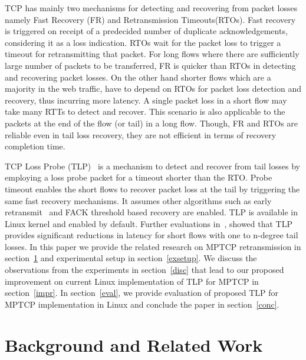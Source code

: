\documentclass[10pt,draftcls,twocolumn]{IEEEconf}
\begin{document}
TCP has mainly two mechanisms for detecting and recovering from packet losses namely Fast Recovery (FR) and Retransmission Timeouts(RTOs). Fast recovery is triggered on receipt of a predecided number of duplicate acknowledgements, considering it as a loss indication. RTOs wait for the packet loss to trigger a timeout for retransmitting that packet. For long flows where there are sufficiently large number of packets to be transferred, FR is quicker than RTOs in detecting and recovering packet losses. On the other hand shorter flows which are a majority in the web traffic, have to depend on RTOs for packet loss detection and recovery, thus incurring more latency. A single packet loss in a short flow may take many RTTs to detect and recover. This scenario is also applicable to the packets at the end of the flow (or tail) in a long flow. Though, FR and RTOs are reliable even in tail loss recovery, they are not efficient in terms of recovery completion time. 

TCP Loss Probe (TLP)~\cite{Flach:2013} is a mechanism to detect and recover from tail losses by employing a loss probe packet for a timeout shorter than the RTO. Probe timeout enables the short flows to recover packet loss at the tail by triggering the same fast recovery mechanisms. It assumes other algorithms such as early retransmit~\cite{rfc5827} and FACK threshold based recovery are enabled. TLP is available in Linux kernel and enabled by default. Further evaluations in~\cite{Rajiullah:2015}, showed that TLP provides significant reductions in latency for short flows with one to n-degree tail losses. In this paper we provide the related research on MPTCP retransmission in section~\ref{relwork} and experimental setup in section~\ref{exsetup}. We discuss the observations from the experiments in section~\ref{disc} that lead to our proposed improvement on current Linux implementation of TLP for MPTCP in section~\ref{impr}. In section~\ref{eval}, we provide evaluation of proposed TLP for MPTCP implementation in Linux and conclude the paper in section~\ref{conc}.
 
\section{Background and Related Work}\label{relwork}
\end{document}
